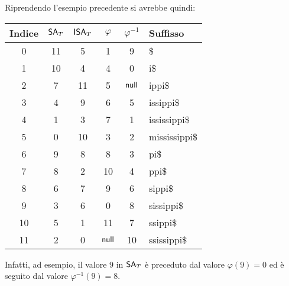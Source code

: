 \begin{esempio}
   Riprendendo l'esempio precedente si avrebbe quindi:
   \begin{table}[H]
     \centering
     \footnotesize
     \begin{tabular}{c|c|c|c|c|l} 
       \textbf{Indice} & $\mbox{\rm {\sf SA}}_T$ & $\mbox{\rm {\sf ISA}}_T$
       & $\varphi$
       & $\varphi^{-1}$ & \textbf{Suffisso}\\  
       \hline
       0 & 11 & 5 & 1 & 9 & \$\\
       1 & 10 & 4 & 4 & 0 & i\$\\
       2 & 7 & 11 & 5 & $\mbox{\rm {\sf null}}$ & ippi\$\\
       3 & 4 & 9 & 6 & 5 & issippi\$\\
       4 & 1 & 3 & 7 & 1 & ississippi\$\\
       5 & 0 & 10 & 3 & 2 & mississippi\$\\
       6 & 9 & 8 & 8 & 3 & pi\$\\
       7 & 8 & 2 & 10 & 4 & ppi\$\\
       8 & 6 & 7 & 9 & 6 & sippi\$\\
       9 & 3 & 6 & 0 & 8 & sissippi\$\\
       10 & 5 & 1 & 11 & 7 & ssippi\$\\
       11 & 2 & 0 & $\mbox{\rm {\sf null}}$ & 10 & ssissippi\$\\
     \end{tabular}
   \end{table}
  Infatti, ad esempio, il valore $9$ in $\mbox{\rm {\sf SA}}_T$ è preceduto dal valore
  $\varphi(9)=0$ ed è seguito dal valore $\varphi^{-1}(9)=8$.
\end{esempio}
